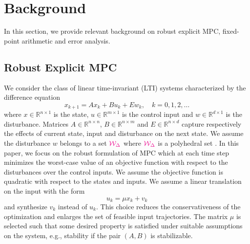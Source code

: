 \section{Background}
In this section, we provide relevant background on robust explicit MPC,
fixed-point arithmetic and error analysis.

\subsection{Robust Explicit MPC}
\def\reals{\mathbb{R}}
We consider the class of linear time-invariant (LTI) systems characterized by the difference equation
\begin{equation}
\label{eq:DSS}
x_{k+1}=Ax_k+Bu_k+Ew_k,\quad  k=0,1,2,\ldots
\end{equation}
where $x\in \reals^{n\times 1}$ is the state, $u\in \reals^{m\times 1}$ is the control input and $w\in \reals^{d\times 1}$ is the disturbance. Matrices $A\in \reals^{n\times n}$, $B\in \reals^{n\times m}$ and $E\in \reals^{n\times d}$  capture respectively the effects of current state, input and disturbance on the next state. We assume the disturbance $w$ belongs to a set $\textcolor{magenta}{\mathcal{W}_{\Delta}}$ where $\textcolor{magenta}{\mathcal{W}_{\Delta}}$ is a polyhedral set .
In this paper, we focus on the robust formulation of MPC which at each time step
minimizes the worst-case value of an objective function with respect to the
disturbances over the control inputs. We assume the objective function is
quadratic with respect to the states and inputs.
We assume a linear translation on the input with the form
$$u_k=\mu x_k+v_k$$
and synthesize $v_k$ instead of $u_k$. This choice reduces the 
conservativeness of the optimization and enlarges the set of feasible input
trajectories. The matrix $\mu$ is selected such that some desired property is satisfied under suitable assumptions on the system, e.g., stability if the pair $(A,B)$ is stabilizable.

